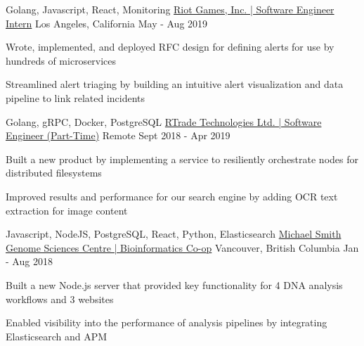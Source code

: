 \begin{cventries}

  \cventry
    {Golang, Javascript, React, Monitoring} %
    {\href{https://bobheadxi.dev/experience/riot-games}{Riot Games, Inc. | Software Engineer Intern}} %
    {Los Angeles, California} %
    {May - Aug 2019} %
    {
      \begin{cvitems} %
        \item {Wrote, implemented, and deployed RFC design for defining alerts for use by hundreds of microservices}
        \item {Streamlined alert triaging by building an intuitive alert visualization and data pipeline to link related incidents}
      \end{cvitems}
    }

  \cventry
    {Golang, gRPC, Docker, PostgreSQL} %
    {\href{https://bobheadxi.dev/experience/rtrade}{RTrade Technologies Ltd. | Software Engineer (Part-Time)}} %
    {Remote} %
    {Sept 2018 - Apr 2019} %
    {
      \begin{cvitems} %
        \item {Built a new product by implementing a service to resiliently orchestrate nodes for distributed filesystems}
        \item {Improved results and performance for our search engine by adding OCR text extraction for image content}
      \end{cvitems}
    }

  \cventry
    {Javascript, NodeJS, PostgreSQL, React, Python, Elasticsearch} %
    {\href{https://bobheadxi.dev/experience/bcgsc}{Michael Smith Genome Sciences Centre | Bioinformatics Co-op}} %
    {Vancouver, British Columbia} %
    {Jan - Aug 2018} %
    {
      \begin{cvitems} %
        \item {Built a new Node.js server that provided key functionality for 4 DNA analysis workflows and 3 websites}
        \item {Enabled visibility into the performance of analysis pipelines by integrating Elasticsearch and APM}
      \end{cvitems}
    }

\end{cventries}
